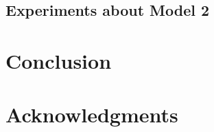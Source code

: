 \documentclass{article}
\begin{document}
\subsection{Experiments about Model 2}

\section{Conclusion}



\section*{Acknowledgments}





\end{document}
